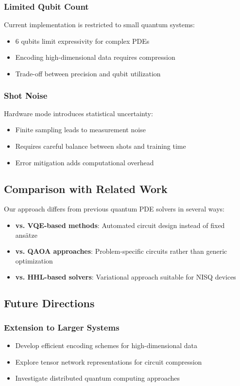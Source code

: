 \documentclass[11pt,a4paper,uplatex,dvipdfmx]{jsarticle}
\begin{document}
\subsubsection{Limited Qubit Count}
Current implementation is restricted to small quantum systems:
\begin{itemize}
    \item 6 qubits limit expressivity for complex PDEs
    \item Encoding high-dimensional data requires compression
    \item Trade-off between precision and qubit utilization
\end{itemize}

\subsubsection{Shot Noise}
Hardware mode introduces statistical uncertainty:
\begin{itemize}
    \item Finite sampling leads to measurement noise
    \item Requires careful balance between shots and training time
    \item Error mitigation adds computational overhead
\end{itemize}

\subsection{Comparison with Related Work}

Our approach differs from previous quantum PDE solvers in several ways:
\begin{itemize}
    \item \textbf{vs. VQE-based methods}: Automated circuit design instead of fixed ansätze
    \item \textbf{vs. QAOA approaches}: Problem-specific circuits rather than generic optimization
    \item \textbf{vs. HHL-based solvers}: Variational approach suitable for NISQ devices
\end{itemize}

\subsection{Future Directions}

\subsubsection{Extension to Larger Systems}
\begin{itemize}
    \item Develop efficient encoding schemes for high-dimensional data
    \item Explore tensor network representations for circuit compression
    \item Investigate distributed quantum computing approaches
\end{itemize}
\end{document}
